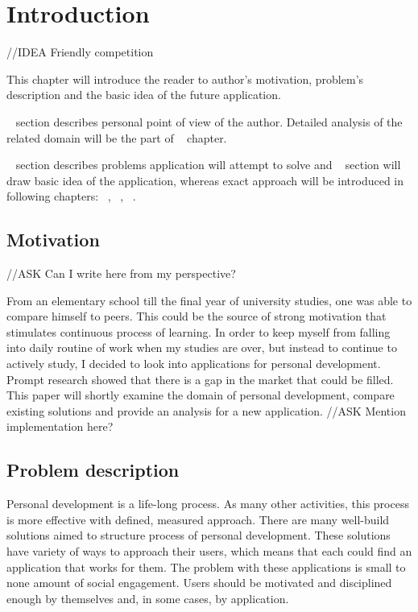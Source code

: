 
\chapter{Introduction}\label{ch:introduction}

{\color{red}//IDEA Friendly competition}

This chapter will introduce the reader to author's motivation, problem's description and the basic idea of the future application.

~ section describes personal point of view of the author.
Detailed analysis of the related domain will be the part of ~ chapter.

~ section describes problems application will attempt to solve and
~ section will draw basic idea of the application, whereas exact approach
will be introduced in following chapters: ~, ~, ~.


\section{Motivation}\label{sec:introduction-motivation}

{\color{gray}//ASK Can I write here from my perspective?}

From an elementary school till the final year of university studies, one was able to compare himself to peers.
This could be the source of strong motivation that stimulates continuous process of learning.
In order to keep myself from falling into daily routine of work when my studies are over,
but instead to continue to actively study, I decided to look into applications for personal development.
Prompt research showed that there is a gap in the market that could be filled.
This paper will shortly examine the domain of personal development, compare existing solutions and provide an analysis for a
new application.
{\color{gray}//ASK Mention implementation here?}

\section{Problem description}\label{sec:problem-description}

Personal development is a life-long process.
As many other activities, this process is more effective with defined, measured approach.
There are many well-build solutions aimed to structure process of personal development.
These solutions have variety of ways to approach their users, which means that each could find an application that works for them.
The problem with these applications is small to none amount of social engagement.
Users should be motivated and disciplined enough by themselves and, in some cases, by application.

